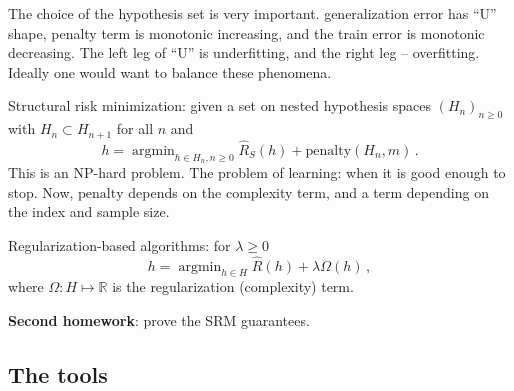 \documentclass[a4paper]{article}
\newcommand{\Real}{\mathbb{R}}
\newcommand{\argmin}{\mathop{\text{argmin}}}
\begin{document}
The choice of the hypothesis set is very important. generalization error has ``U''
shape, penalty term is monotonic increasing, and the train error is monotonic decreasing.
The left leg of ``U'' is underfitting, and the right leg -- overfitting. Ideally one
would want to balance these phenomena.

Structural risk minimization: given a set on nested hypothesis spaces $(H_n)_{n\geq 0}$
with $H_n \subset H_{n+1}$ for all $n$ and
\[ h = \argmin_{h\in H_n, n\geq 0} \hat{R}_S(h) + \text{penalty}(H_n, m) \,. \]
This is an NP-hard problem. The problem of learning: when it is good enough to stop.
Now, $\text{penalty}$ depends on the complexity term, and a term depending on the
index and sample size.

Regularization-based algorithms: for $\lambda \geq 0$
\[ h = \argmin_{h\in H}\hat{R}(h) + \lambda \Omega(h) \,, \]
where $\Omega:H \mapsto \Real$ is the regularization (complexity) term.

\textbf{Second homework}: prove the SRM guarantees.


\subsection{The tools} %
\label{sub:the_tools}
\end{document}
